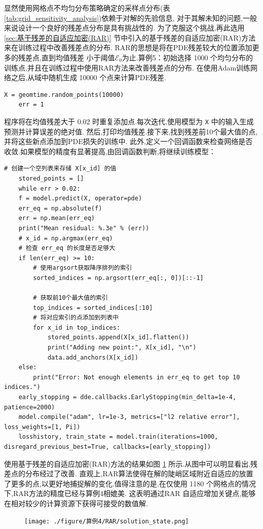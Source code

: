 \documentclass{Sichuan Normal University}
\begin{document}
显然使用网格点不均匀分布策略确定的采样点分布(表 \ref{tab:grid_sensitivity_analysis})依赖于对解的先验信息,
对于其解未知的问题,一般来说设计一个良好的残差点分布是具有挑战性的.
为了克服这个挑战,再此选用 \ref{sec:基于残差的自适应加密(RAR)} 节中引入的基于残差的自适应加密(RAR)方法\cite{luDeepXDEDeepLearning2021}来在训练过程中改善残差点的分布.
RAR的思想是将在PDE残差较大的位置添加更多的残差点,直到均值残差
小于阈值$\mathcal{E}_0$为止.算例5：初始选择 1000 个均匀分布的训练点,并且在训练过程中使用RAR方法来改善残差点的分布.
在使用Adam训练网络之后,从域中随机生成 10000 个点来计算PDE残差.
\begin{lstlisting}[style=python,basicstyle=\footnotesize\fontspec{Courier New},]  
    X = geomtime.random_points(10000)
    err = 1    
\end{lstlisting}
程序将在均值残差大于 0.02 时重复添加点.每次迭代,使用模型为 \texttt{X} 中的输入生成预测并计算误差的绝对值.
然后,打印均值残差.接下来,找到残差前10个最大值的点,并将这些新点添加到PDE损失的训练中.
此外,定义一个回调函数来检查网络是否收敛.如果模型的精度有显著提高,由回调函数判断,将继续训练模型：
\begin{lstlisting}[style=python,basicstyle=\footnotesize\fontspec{Courier New},]  
    # 创建一个空列表来存储 X[x_id] 的值
    stored_points = []
    while err > 0.02:
    f = model.predict(X, operator=pde)
    err_eq = np.absolute(f)
    err = np.mean(err_eq)
    print("Mean residual: %.3e" % (err))
    # x_id = np.argmax(err_eq)
    # 检查 err_eq 的长度是否足够大
    if len(err_eq) >= 10:
        # 使用argsort获取降序排列的索引
        sorted_indices = np.argsort(err_eq[:, 0])[::-1]

        # 获取前10个最大值的索引
        top_indices = sorted_indices[:10]
        # 将对应索引的点添加到列表中
        for x_id in top_indices:
            stored_points.append(X[x_id].flatten())
            print("Adding new point:", X[x_id], "\n")
            data.add_anchors(X[x_id])
    else:
        print("Error: Not enough elements in err_eq to get top 10 indices.")
    early_stopping = dde.callbacks.EarlyStopping(min_delta=1e-4, patience=2000)
    model.compile("adam", lr=1e-3, metrics=["l2 relative error"], loss_weights=[1, Pi])
    losshistory, train_state = model.train(iterations=1000, disregard_previous_best=True, callbacks=[early_stopping])
\end{lstlisting}
使用基于残差的自适应加密(RAR)方法的结果如图 \ref{fig:RAR网格点分布图} 所示.从图中可以明显看出,残差点的分布经过了改善.
直观上,RAR算法使得在解的陡峭区域附近自适应的放置了更多的点,以更好地捕捉解的变化.值得注意的是,在仅使用 1180 个网格点的情况下,RAR方法的精度已经与算例4相媲美.
这表明通过RAR 自适应增加关键点,能够在相对较少的计算资源下获得可接受的数值解.
\begin{figure}[H]
    \centering
    \texttt{[image: ./figure/算例4/RAR/solution\_state.png]}
    \label{fig:RAR网格点分布图}
\end{figure}
\end{document}
